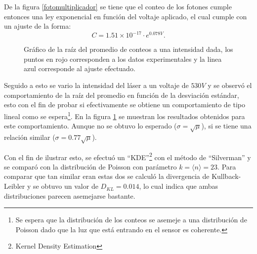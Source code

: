 \documentclass[%
 reprint,
 amsmath,amssymb,
 aps,
]{revtex4-1}
\begin{document}
De la figura \ref{fotomultiplicador} se tiene que el conteo de los fotones cumple entonces una ley exponencial en función del voltaje aplicado, el cual cumple con un ajuste de la forma:
\begin{equation}
C=1.51\times10^{-17}\cdot e^{0.078V}.
\end{equation}

\begin{figure}[h]
\caption{\label{promedios_std} Gráfico de la raíz del promedio de conteos a una intensidad dada, los puntos en rojo corresponden a los datos experimentales y la linea azul corresponde al ajuste efectuado.}
\end{figure}

Seguido a esto se vario la intensidad del láser a un voltaje de $530 V$ y se observó el comportamiento de la raíz del promedio en función de la desviación estándar, esto con el fin de probar si efectivamente se obtiene un comportamiento de tipo lineal como se espera\footnote{Se espera que la distribución de los conteos se asemeje a una distribución de Poisson dado que la luz que está entrando en el sensor es coherente.}. En la figura \ref{promedios_std} se muestran los resultados obtenidos para este comportamiento. Aunque no se obtuvo lo esperado ($\sigma=\sqrt{\mu}$), si se tiene una relación similar ($\sigma=0.77\sqrt{\mu}$).


Con el fin de ilustrar esto, se efectuó un ``KDE''\footnote{Kernel Density Estimation} con el método de ``Silverman'' y se comparó con la distribución de Poisson con parámetro $k=\langle n\rangle=23$. Para comparar que tan similar eran estas dos se calculó la divergencia de Kullback-Leibler y se obtuvo un valor de $D_{KL}=0.014$, lo cual indica que ambas distribuciones parecen asemejarse bastante.
\end{document}

